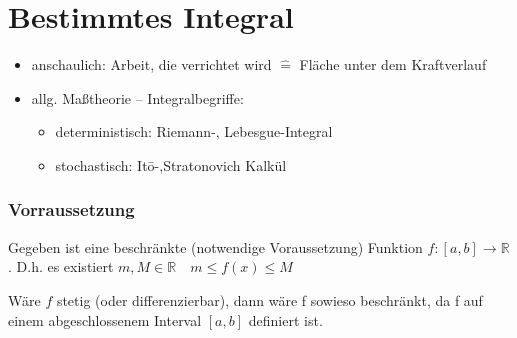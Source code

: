
\section{Bestimmtes Integral}
\label{sub:bestInt}

\begin{itemize}
	\item anschaulich: Arbeit, die verrichtet wird \( \hat{=} \) Fläche unter dem Kraftverlauf
	\item allg. Maßtheorie – Integralbegriffe: 
	\begin{itemize}
		\item deterministisch: Riemann-, Lebesgue-Integral
		\item stochastisch: It\={o}-,Stratonovich Kalkül
	\end{itemize}
\end{itemize}

\subsubsection{Vorraussetzung}

Gegeben ist eine beschränkte (notwendige Voraussetzung) Funktion \( f:[a,b]\rightarrow \mathbb{R} \). D.h. es existiert \(  m, M \in \mathbb{R} \quad m \leq f(x) \leq M \)

\begin{note}
	Wäre \( f \) stetig (oder differenzierbar), dann wäre f sowieso beschränkt, da f auf einem abgeschlossenem Interval \( [a,b] \) definiert ist.
\end{note}


